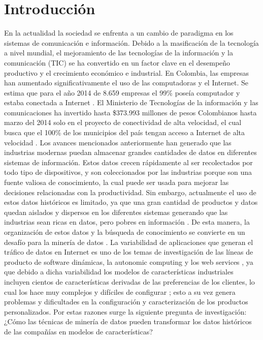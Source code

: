 \chapter*{Introducción}

En la actualidad la sociedad se enfrenta a un cambio de paradigma en los sistemas de comunicación e información. Debido a la masificación de la tecnología a nivel mundial, el mejoramiento de las tecnologías de la información y la comunicación (TIC) se ha convertido en un factor clave en el desempeño productivo y el crecimiento económico e industrial. En Colombia, las empresas han aumentado significativamente el uso de las computadoras y el Internet. Se estima que para el año 2014 de 8.659 empresas el 99\% poseía computador y estaba conectada a Internet \cite{Comunicaciones2014}. El Ministerio de Tecnologías de la información y las comunicaciones ha invertido hasta \$373.993 millones de pesos Colombianos hasta marzo del 2014 solo en el proyecto de conectividad de alta velocidad, el cual busca que el 100\% de los municipios del país tengan acceso a Internet de alta velocidad \cite{Ardila2015}.
Los avances mencionados anteriormente han generado que las industrias modernas puedan almacenar grandes cantidades de datos en diferentes sistemas de información. Estos datos crecen rápidamente al ser recolectados por todo tipo de dispositivos, y son coleccionados por las industrias porque son una fuente valiosa de conocimiento, la cual puede ser usada para mejorar las decisiones relacionadas con la productividad. Sin embargo, actualmente el uso de estos datos históricos es limitado, ya que una gran cantidad de productos y datos quedan aislados y dispersos en los diferentes sistemas generando que las industrias sean ricas en datos, pero pobres en información \cite{Elovici2003}. De esta manera, la organización de estos datos y la búsqueda de conocimiento se convierte en un desafío para la minería de datos \cite{Hastie2009}.
La variabilidad de aplicaciones que generan el tráfico de datos en Internet es uno de los temas de investigación de las líneas de producto de software dinámicas, la autonomic computing y los web services \cite{Capilla2013}, ya que debido a dicha variabilidad los modelos de características industriales incluyen cientos de características derivadas de las preferencias de los clientes, lo cual los hace muy complejos y difíciles de configurar \cite{Asadi2014}; esto a su vez genera problemas y dificultades en la configuración y caracterización de los productos personalizados. Por estas razones surge la siguiente pregunta de investigación: ¿Cómo las técnicas de minería de datos pueden transformar los datos históricos de las compañías en modelos de características?
